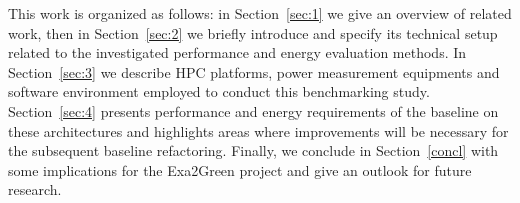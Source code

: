 This  work is  organized as  follows: in  Section~\ref{sec:1} we  give an
overview  of  related  work,   then  in  Section~\ref{sec:2}  we  briefly
introduce \cosmoart  and specify its  technical setup related
to  the investigated  performance and  energy evaluation  methods.  In
Section~\ref{sec:3}   we  describe   HPC  platforms,   power  measurement
equipments   and  software  environment   employed  to   conduct  this
benchmarking study.  Section~\ref{sec:4}  presents performance and energy
requirements  of the  baseline on  these architectures  and highlights
areas where improvements will be necessary for the subsequent baseline
refactoring.   Finally,  we  conclude in Section~\ref{concl} with some 
implications for the Exa2Green project and give an outlook for future
research.

